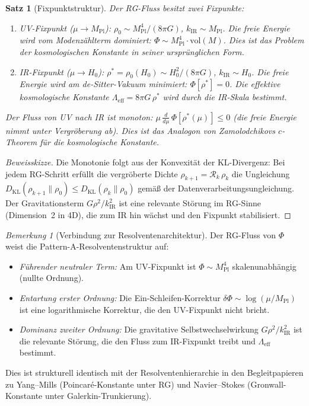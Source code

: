 \documentclass[12pt,a4paper]{article}
\theoremstyle{definition}
\theoremstyle{plain}
\newtheorem{proposition}[definition]{Satz}
\theoremstyle{remark}
\newtheorem{remark}[definition]{Bemerkung}
\begin{document}
\begin{proposition}[Fixpunktstruktur]
\label{prop:rg-fixed-points}
Der RG-Fluss besitzt zwei Fixpunkte:
\begin{enumerate}
\item \emph{UV-Fixpunkt} ($\mu \to M_{\mathrm{Pl}}$):
  $\rho_{0} \sim M_{\mathrm{Pl}}^{4}/(8\pi G)$,
  $k_{\mathrm{IR}} \sim M_{\mathrm{Pl}}$.
  Die freie Energie wird vom Modenz\"ahlterm dominiert:
  $\Phi \sim M_{\mathrm{Pl}}^{4}\cdot\mathrm{vol}(M)$.
  Dies ist das Problem der kosmologischen Konstante in seiner
  urspr\"unglichen Form.
\item \emph{IR-Fixpunkt} ($\mu \to H_{0}$):
  $\rho^{*} = \rho_{0}(H_{0}) \sim H_{0}^{2}/(8\pi G)$,
  $k_{\mathrm{IR}} \sim H_{0}$.
  Die freie Energie wird am de-Sitter-Vakuum minimiert:
  $\Phi[\rho^{*}] = 0$.
  Die effektive kosmologische Konstante
  $\Lambda_{\mathrm{eff}} = 8\pi G\,\rho^{*}$ wird durch die
  IR-Skala bestimmt.
\end{enumerate}
Der Fluss von UV nach IR ist monoton:
$\mu\,\frac{d}{d\mu}\,\Phi[\rho^{*}(\mu)] \leq 0$
(die freie Energie nimmt unter Vergr\"oberung ab).
Dies ist das Analogon von Zamolodchikovs $c$-Theorem f\"ur die
kosmologische Konstante.
\end{proposition}

\begin{proof}[Beweisskizze]
Die Monotonie folgt aus der Konvexit\"at der KL-Divergenz: Bei jedem
RG-Schritt erf\"ullt die vergr\"oberte Dichte
$\rho_{k+1} = \mathcal{R}_{k}\,\rho_{k}$ die Ungleichung
$D_{\mathrm{KL}}(\rho_{k+1}\|\rho_{0})
 \leq D_{\mathrm{KL}}(\rho_{k}\|\rho_{0})$
gem\"a\ss{} der Datenverarbeitungsungleichung.  Der Gravitationsterm
$G\rho^{2}/k_{\mathrm{IR}}^{2}$ ist eine relevante St\"orung im
RG-Sinne (Dimension~2 in 4D), die zum IR hin w\"achst und den
Fixpunkt stabilisiert.
\end{proof}

\begin{remark}[Verbindung zur Resolventenarchitektur]
\label{rem:rg-resolvent}
Der RG-Fluss von $\Phi$ weist die Pattern-A-Resolventenstruktur auf:
\begin{itemize}
\item \emph{F\"uhrender neutraler Term:}
  Am UV-Fixpunkt ist $\Phi \sim M_{\mathrm{Pl}}^{4}$
  skalenunabh\"angig (nullte Ordnung).
\item \emph{Entartung erster Ordnung:}
  Die Ein-Schleifen-Korrektur
  $\delta\Phi \sim \log(\mu/M_{\mathrm{Pl}})$ ist eine logarithmische
  Korrektur, die den UV-Fixpunkt nicht bricht.
\item \emph{Dominanz zweiter Ordnung:}
  Die gravitative Selbstwechselwirkung
  $G\rho^{2}/k_{\mathrm{IR}}^{2}$ ist die relevante St\"orung, die
  den Fluss zum IR-Fixpunkt treibt und $\Lambda_{\mathrm{eff}}$
  bestimmt.
\end{itemize}
Dies ist strukturell identisch mit der Resolventenhierarchie in den
Begleitpapieren zu Yang--Mills (Poincar\'e-Konstante unter RG) und
Navier--Stokes (Gronwall-Konstante unter Galerkin-Trunkierung).
\end{remark}
\end{document}

